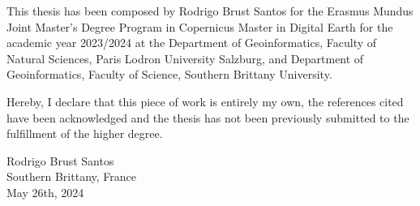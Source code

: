 

\renewcommand{\declarationtitle}{Declaration}
\begin{declaration}
	This thesis has been composed by Rodrigo Brust Santos for the Erasmus
Mundus Joint Master's Degree Program in Copernicus Master in Digital Earth for the
academic year 2023/2024 at the Department of Geoinformatics, Faculty of Natural
Sciences, Paris Lodron University Salzburg, and Department of Geoinformatics, Faculty
of Science, Southern Brittany University.

Hereby, I declare that this piece of work is entirely my own, the references cited have
been acknowledged and the thesis has not been previously submitted to the fulfillment of
the higher degree.

\begin{flushright}
 Rodrigo Brust Santos \\
Southern Brittany, France \\
May 26th, 2024
\end{flushright}
\end{declaration}
